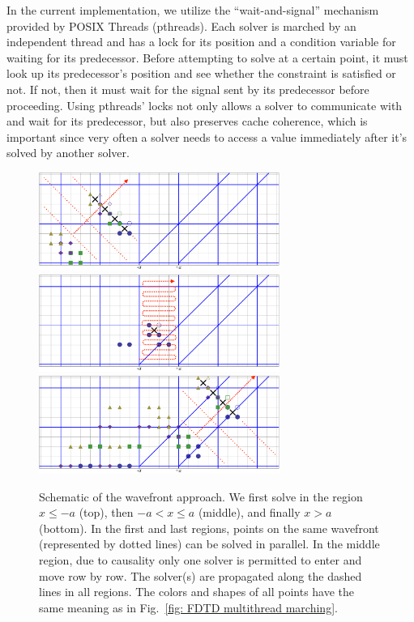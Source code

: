 \documentclass[final,1p,times]{elsarticle}
\begin{document}
In the current implementation, we utilize the ``wait-and-signal'' mechanism provided by POSIX Threads (pthreads). Each solver is marched by an independent thread and has a lock for its position and a condition variable for waiting for its predecessor. Before attempting to solve at a certain point, it must look up its predecessor's position and see whether the constraint is satisfied or not. If not, then it must wait for the signal sent by its predecessor before proceeding. 
Using pthreads' locks not only allows a solver to communicate with and wait for its predecessor, but also preserves cache coherence, which is important since very often a solver needs to access a value immediately after it's solved by another solver. 

\begin{figure}[hbtp]
	\centering
	\includegraphics[width=0.7\textwidth]{FDTD_wavefront_schematic-1}\\
	\includegraphics[width=0.7\textwidth]{FDTD_wavefront_schematic-2}\\
	\includegraphics[width=0.7\textwidth]{FDTD_wavefront_schematic-3}
	\caption{Schematic of the wavefront  approach. We first solve in the region $x\leq -a$ (top), then $-a<x\leq a$ (middle), and finally $x>a$ (bottom). In the first and last regions, points on the same wavefront (represented by dotted lines) can be solved in parallel. In the middle region, due to causality only one solver is permitted to enter and move row by row. The solver(s) are propagated along the dashed lines in all regions. The colors and shapes of all points have the same meaning as in Fig.~\ref{fig: FDTD multithread marching}.}
	\label{fig: FDTD wavefront marching}
\end{figure}
\end{document}
